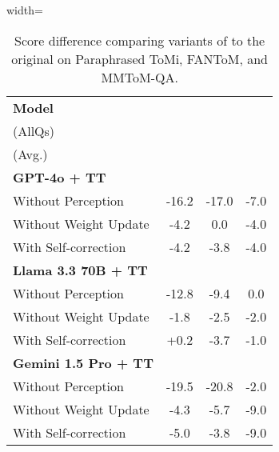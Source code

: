 \begin{wraptable}[15]{r}{0.52\textwidth}
    \vspace{-1em}
    \centering
    \begin{adjustbox}{width=\linewidth}
    \renewcommand{\arraystretch}{1.08}
    \begin{tabular}{lccc}
    \toprule
        \multirow{2}{*}{\textbf{Model}} 
        &{\makecell{\textbf{Paraphrased}\\\textbf{ToMi} (Avg.)}}
        &{\makecell{\textbf{FANToM}\\(AllQs)}} 
        &{\makecell{\textbf{MMToM}\\(Avg.)}} \\
        
        \midrule
        \textbf{GPT-4o + TT}             &           &           &       \\
        Without Perception          & -16.2     & -17.0     & -7.0   \\
        Without Weight Update       & -4.2      & 0.0       & -4.0 \\
        With Self-correction        & -4.2      & -3.8      & -4.0  \\
        \midrule
        \textbf{Llama 3.3 70B + TT}                      & &   & \\
        Without Perception               & -12.8     & -9.4      & 0.0  \\
        Without Weight Update            & -1.8     & -2.5      & -2.0 \\
        With Self-correction             & +0.2     & -3.7      & -1.0         \\
        \midrule
        \textbf{Gemini 1.5 Pro + TT}                      & &  & \\
        Without Perception               & -19.5     & -20.8     & -2.0  \\
        Without Weight Update            & -4.3     & -5.7       & -9.0 \\
        With Self-correction             & -5.0     & -3.8       & -9.0         \\
        \bottomrule
    \end{tabular}
    \end{adjustbox}
    \vspace{-0.5em}    
    \caption{
        Score difference comparing variants of \tracing to the original \tracing on Paraphrased ToMi, FANToM, and MMToM-QA.
    }
    \label{tab:variants}
\end{wraptable}

        
